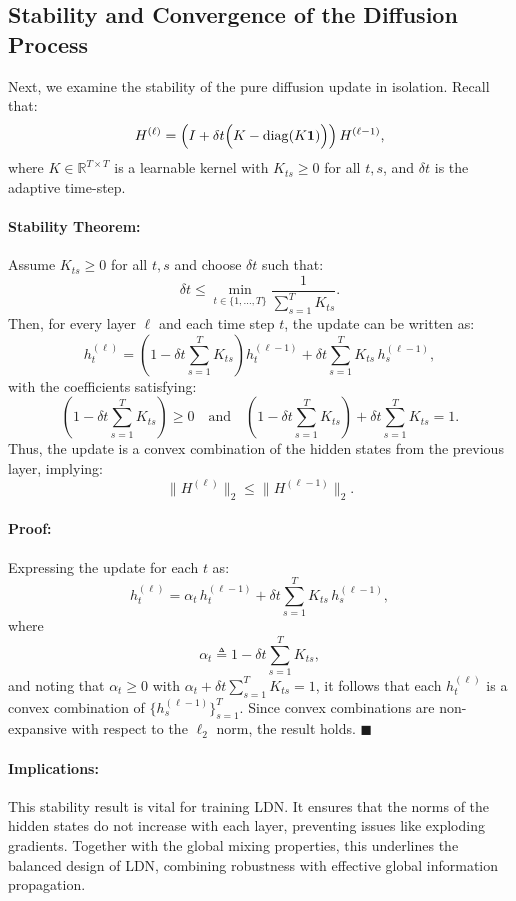 \subsection{Stability and Convergence of the Diffusion Process}
Next, we examine the stability of the pure diffusion update in isolation. Recall that:
\[
H^{(\ell)} = \left(I + \delta t \Bigl(K - \operatorname{diag}(K \mathbf{1})\Bigr)\right) H^{(\ell-1)},
\]
where \(K \in \mathbb{R}^{T \times T}\) is a learnable kernel with \(K_{ts} \ge 0\) for all \(t,s\), and \(\delta t\) is the adaptive time-step.

\paragraph{Stability Theorem:}  
Assume \(K_{ts} \ge 0\) for all \(t,s\) and choose \(\delta t\) such that:
\[
\delta t \le \min_{t \in \{1,\dots,T\}} \frac{1}{\sum_{s=1}^{T} K_{ts}}.
\]
Then, for every layer \(\ell\) and each time step \(t\), the update can be written as:
\[
h_t^{(\ell)} = \left(1 - \delta t \sum_{s=1}^{T} K_{ts}\right) h_t^{(\ell-1)} + \delta t \sum_{s=1}^{T} K_{ts}\, h_s^{(\ell-1)},
\]
with the coefficients satisfying:
\[
\left(1 - \delta t \sum_{s=1}^{T} K_{ts}\right) \ge 0 \quad \text{and} \quad \left(1 - \delta t \sum_{s=1}^{T} K_{ts}\right) + \delta t \sum_{s=1}^{T} K_{ts} = 1.
\]
Thus, the update is a convex combination of the hidden states from the previous layer, implying:
\[
\|H^{(\ell)}\|_2 \le \|H^{(\ell-1)}\|_2.
\]

\paragraph{Proof:}  
Expressing the update for each \(t\) as:
\[
h_t^{(\ell)} = \alpha_t\, h_t^{(\ell-1)} + \delta t \sum_{s=1}^{T} K_{ts}\, h_s^{(\ell-1)},
\]
where
\[
\alpha_t \triangleq 1 - \delta t \sum_{s=1}^{T} K_{ts},
\]
and noting that \(\alpha_t \ge 0\) with \(\alpha_t + \delta t \sum_{s=1}^{T} K_{ts} = 1\), it follows that each \(h_t^{(\ell)}\) is a convex combination of \(\{h_s^{(\ell-1)}\}_{s=1}^T\). Since convex combinations are non-expansive with respect to the \(\ell_2\) norm, the result holds. \(\blacksquare\)

\paragraph{Implications:}  
This stability result is vital for training LDN. It ensures that the norms of the hidden states do not increase with each layer, preventing issues like exploding gradients. Together with the global mixing properties, this underlines the balanced design of LDN, combining robustness with effective global information propagation.
